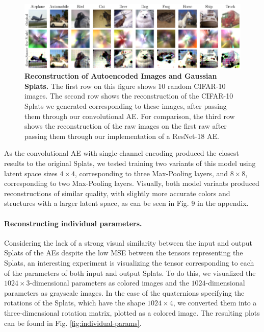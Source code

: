\begin{figure}
    \centering    \includegraphics[width=1\linewidth]{fig/reconstruction_comparison.pdf}
    \caption{\textbf{Reconstruction of Autoencoded Images and Gaussian Splats.} The first row on this figure shows 10 random CIFAR-10 images. The second row shows the reconstruction of the CIFAR-10 Splats we generated corresponding to these images, after passing them through our convolutional AE. For comparison, the third row shows the reconstruction of the raw images on the first raw after passing them through our implementation of a ResNet-18 AE.}
    \label{fig:ae-reconstructions}
\end{figure}

As the convolutional AE with single-channel encoding produced the closest results to the original Splats, we tested training two variants of this model using latent space sizes $4\times4$, corresponding to three Max-Pooling layers, and $8\times8$, corresponding to two Max-Pooling layers. Visually, both model variants produced reconstructions of similar quality, with slightly more accurate colors and structures with a larger latent space, as can be seen in Fig. 9 in the appendix.

\paragraph{Reconstructing individual parameters.}

Considering the lack of a strong visual similarity between the input and output Splats of the AEs despite the low MSE between the tensors representing the Splats, an interesting experiment is visualizing the tensor corresponding to each of the parameters of both input and output Splats. To do this, we visualized the $1024 \times 3$-dimensional parameters as colored images and the $1024$-dimensional parameters as grayscale images. In the case of the quaternions specifying the rotations of the Splats, which have the shape $1024\times4$, we converted them into a three-dimensional rotation matrix, plotted as a colored image. The resulting plots can be found in Fig. \ref{fig:individual-params}.

